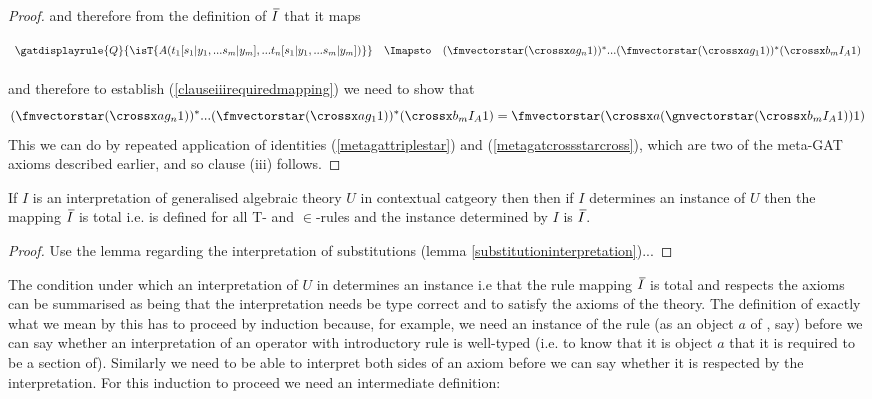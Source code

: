\begin{proof}
and therefore from the definition of $\Ibar$ that it maps
\begin{equation*}
\begin{array}{c c c}
\forceSOURCEwidth & & \forceTARGETwidth \\ [-0.1cm]
\gatdisplayrule{Q}{\isT{A(t_1[\ssubbedfory],...t_n[\ssubbedfory])}}  & \Imapsto & \clausethreelhs \\ [0.4cm]
\end{array}
\end{equation*}
and therefore to establish (\ref{clauseiiirequiredmapping}) we need to show that
\begin{equation*}
\clausethreelhs = \clausethreerhs										
\end{equation*}
This we can do by repeated application of identities (\ref{metagattriplestar})
and (\ref{metagatcrossstarcross}), which are two of the meta-GAT axioms described earlier,
and so clause (iii) follows.


\iffalse
[(iv)] if, in addition, $r_s$ is the rule \srule and is  derived rule of $U$ that is mapped by $I$
to a section $g$ of \catcw
then the rule \srulesubstituted[,] which is a derived rule of $U$ by virtue of the substitution lemma, is mapped by $I$ 
to the section $\fmstar...\fonestar (\crossx{a}{g}{1})$ of \catcw
\fi
\mbox{}\hfill {}
\end{proof} 


\begin{lemma} 
If $I$ is an interpretation of generalised algebraic theory $U$ in contextual catgeory \catcw then then if $I$ determines an instance of $U$ then the
mapping $\Ibar$  is total i.e. is defined for all T- and $\in$-rules and the instance determined by $I$ is $\Ibar$.
\end{lemma}
\begin{proof}  
Use the lemma regarding the interpretation of substitutions (lemma \ref{substitutioninterpretation})...
\end{proof}

The condition under which an interpretation of $U$ in \catcw determines an instance i.e that the rule mapping $\Ibar$ is total and respects the axioms can be summarised as being that the interpretation needs be type correct and to satisfy the axioms of the theory. The definition of exactly what we mean by this has to proceed by induction because, for example, we need an instance of the rule
 (as an object $a$ of \catc, say) before we can say whether an interpretation of an operator with introductory rule \genericfintroductoryrule
is well-typed (i.e. to know that it is object $a$ that it is required to be a section of).
Similarly we need to be able to interpret both sides of an axiom before we can say whether it is respected
by the interpretation. For this induction to proceed we need an intermediate definition:

